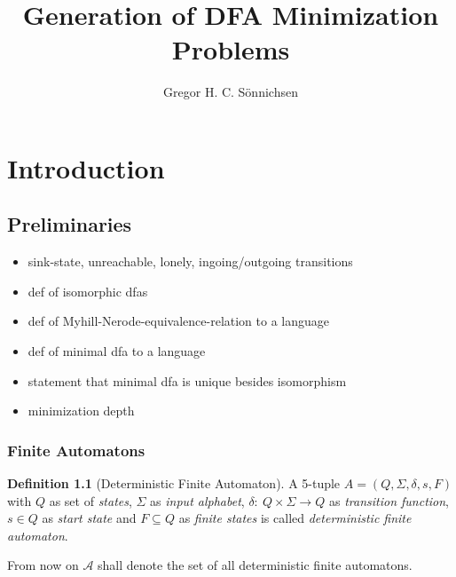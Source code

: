 \documentclass[a4paper, oneside, 11pt]{report}
\title{Generation of DFA Minimization Problems}
\author{Gregor H. C. Sönnichsen}
\theoremstyle{definition}
\newtheorem{definition}{Definition}
\theoremstyle{remark}
\begin{document}
\maketitle



\tableofcontents

\chapter{Introduction}

\section{Preliminaries}

\begin{itemize}
	\item sink-state, unreachable, lonely, ingoing/outgoing transitions
	\item def of isomorphic dfas
	\item def of Myhill-Nerode-equivalence-relation to a language
	\item def of minimal dfa to a language
	\item statement that minimal dfa is unique besides isomorphism
	\item minimization depth
\end{itemize}

\subsection{Finite Automatons}

\begin{definition}[Deterministic Finite Automaton]
	A 5-tuple $A = (Q, \Sigma, \delta, s, F)$ with $Q$ as set of \emph{states}, $\Sigma$ as \emph{input alphabet}, $\delta \colon\ Q \times \Sigma \to Q$ as \emph{transition function}, $s \in Q$ as \emph{start state} and $F \subseteq Q$ as \emph{finite states} is called \emph{deterministic finite automaton}.
\end{definition}
\noindent From now on $\mathcal{A}$ shall denote the set of all deterministic finite automatons.
\end{document}
